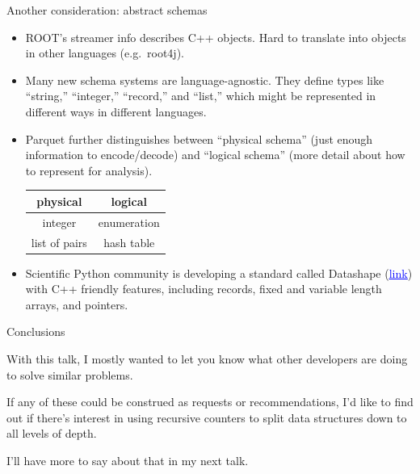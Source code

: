 \documentclass{beamer}
\begin{document}
\begin{frame}{Another consideration: abstract schemas}
\vspace{0.5 cm}
\begin{itemize}\setlength{\itemsep}{0.3 cm}
\item ROOT's streamer info describes C++ objects. Hard to translate into objects in other languages (e.g.\ root4j).

\item<2-> Many new schema systems are language-agnostic. They define types like ``string,'' ``integer,'' ``record,'' and ``list,'' which might be represented in different ways in different languages.

\item<3-> Parquet further distinguishes between ``physical schema'' (just enough information to encode/decode) and ``logical schema'' (more detail about how to represent for analysis).
\begin{center}
\begin{tabular}{c c}
physical & logical \\\hline
integer & enumeration \\
list of pairs & hash table \\
\end{tabular}
\end{center}

\item<4-> Scientific Python community is developing a standard called Datashape (\href{http://datashape.readthedocs.io/en/latest/overview.html}{\textcolor{blue}{\underline{link}}}) with C++ friendly features, including records, fixed and variable length arrays, and pointers.
\end{itemize}
\end{frame}

\begin{frame}{Conclusions}
\begin{block}{}
With this talk, I mostly wanted to let you know what other developers are doing to solve similar problems.
\end{block}

\begin{block}{}
If any of these could be construed as requests or recommendations, I'd like to find out if there's interest in using recursive counters to split data structures down to all levels of depth.
\end{block}

\begin{block}{}
I'll have more to say about that in my next talk.
\end{block}
\end{frame}
\end{document}
